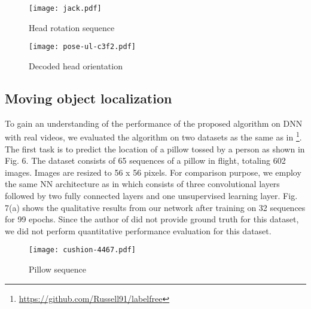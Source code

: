 \documentclass{article}
\begin{document}
\begin{figure}[h]
\begin{center}
\centerline{\texttt{[image: jack.pdf]}}
\caption{Head rotation sequence}
\label{head-pan}
\end{center}
\vskip -0.2in
\end{figure}

\begin{figure}[h]
\begin{center}
\centerline{\texttt{[image: pose-ul-c3f2.pdf]}} 
\caption{Decoded head orientation}
\label{head-orientation}
\end{center}
\vskip -0.2in
\end{figure}

\subsection{Moving object localization}
To gain an understanding of the performance of the proposed 
algorithm on DNN with real videos, we evaluated the algorithm on two datasets 
as the same as in \cite{Stewart17}\footnote{\url{https://github.com/Russell91/labelfree}}. The first task is to predict the location of a pillow tossed by a 
person as shown in Fig. 6. The dataset consists of 65 sequences of a pillow in 
flight, totaling 602 images. Images are resized to 56 x 56 pixels. For 
comparison purpose, we employ the same NN architecture as in \cite{Stewart17} 
which consists of three
convolutional layers followed by two fully connected layers and one unsupervised
 learning layer.
Fig. 7(a) shows the qualitative results from our network after training on 32 sequences for 99 epochs. Since the author of \cite{Stewart17} did not provide ground truth for this dataset, we did not perform quantitative performance evaluation for this dataset. 

\begin{figure}[h]
\begin{center}
\centerline{\texttt{[image: cushion-4467.pdf]}}
\caption{Pillow sequence}
\label{pillow}
\end{center}
\vskip -0.2in
\end{figure}

\begin{figure}[t!]
\centering

\caption{}
\end{figure}
\end{document}
